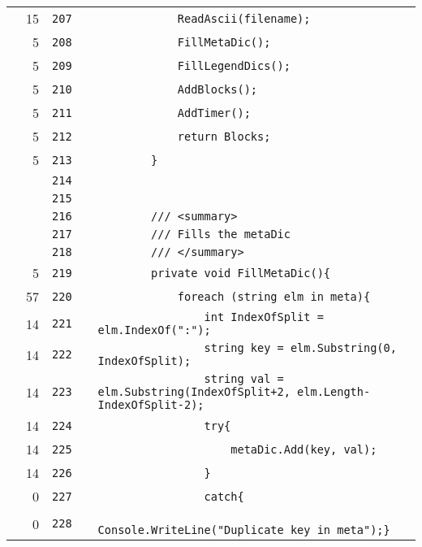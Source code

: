 \documentclass[a4paper,landscape,10pt]{article}
\begin{document}
\begin{longtable}[l]{lrrll}
\cellcolor{green} & 15 & \verb~207~ & & \verb~            ReadAscii(filename);~\\
\cellcolor{green} & 5 & \verb~208~ & & \verb~            FillMetaDic();~\\
\cellcolor{green} & 5 & \verb~209~ & & \verb~            FillLegendDics();~\\
\cellcolor{green} & 5 & \verb~210~ & & \verb~            AddBlocks();~\\
\cellcolor{green} & 5 & \verb~211~ & & \verb~            AddTimer();~\\
\cellcolor{green} & 5 & \verb~212~ & & \verb~            return Blocks;~\\
\cellcolor{green} & 5 & \verb~213~ & & \verb~        }~\\
\cellcolor{gray} &  & \verb~214~ & & \verb~~\\
\cellcolor{gray} &  & \verb~215~ & & \verb~~\\
\cellcolor{gray} &  & \verb~216~ & & \verb~        /// <summary>~\\
\cellcolor{gray} &  & \verb~217~ & & \verb~        /// Fills the metaDic~\\
\cellcolor{gray} &  & \verb~218~ & & \verb~        /// </summary>~\\
\cellcolor{green} & 5 & \verb~219~ & & \verb~        private void FillMetaDic(){~\\
\cellcolor{green} & 57 & \verb~220~ & & \verb~            foreach (string elm in meta){~\\
\cellcolor{green} & 14 & \verb~221~ & & \verb~                int IndexOfSplit = elm.IndexOf(":");~\\
\cellcolor{green} & 14 & \verb~222~ & & \verb~                string key = elm.Substring(0, IndexOfSplit);~\\
\cellcolor{green} & 14 & \verb~223~ & & \verb~                string val = elm.Substring(IndexOfSplit+2, elm.Length-IndexOfSplit-2);~\\
\cellcolor{green} & 14 & \verb~224~ & & \verb~                try{~\\
\cellcolor{green} & 14 & \verb~225~ & & \verb~                    metaDic.Add(key, val);~\\
\cellcolor{green} & 14 & \verb~226~ & & \verb~                }~\\
\cellcolor{red} & 0 & \verb~227~ & & \verb~                catch{~\\
\cellcolor{red} & 0 & \verb~228~ & & \verb~                    Console.WriteLine("Duplicate key in meta");}~\\

\end{longtable}
\end{document}
